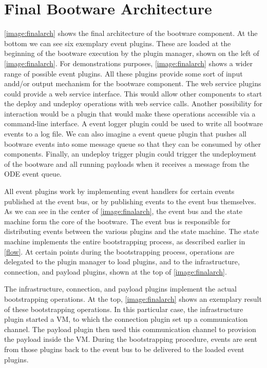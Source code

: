 \section{Final Bootware Architecture}
\label{finalarch}

\autoref{image:finalarch} shows the final architecture of the bootware component.
At the bottom we can see six exemplary event plugins.
These are loaded at the beginning of the bootware execution by the plugin manager, shown on the left of \autoref{image:finalarch}.
For demonstrations purposes, \autoref{image:finalarch} shows a wider range of possible event plugins.
All these plugins provide some sort of input andd/or output mechanism for the bootware component.
The web service plugins could provide a web service interface.
This would allow other components to start the deploy and undeploy operations with web service calls.
Another possibility for interaction would be a  plugin that would make these operations accessible via a command-line interface.
A event logger plugin could be used to write all bootware events to a log file.
We can also imagine a event queue plugin that pushes all bootware events into some message queue so that they can be consumed by other components.
Finally, an undeploy trigger plugin could trigger the undeployment of the bootware and all running payloads when it receives a message from the ODE event queue.

All event plugins work by implementing event handlers for certain events published at the event bus, or by publishing events to the event bus themselves.
As we can see in the center of \autoref{image:finalarch}, the event bus and the state machine form the core of the bootware.
The event bus is responsible for distributing events between the various plugins and the state machine.
The state machine implements the entire bootstrapping process, as described earlier in \autoref{flow}.
At certain points during the bootstrapping process, operations are delegated to the plugin manager to load plugins, and to the infrastructure, connection, and payload plugins, shown at the top of \autoref{image:finalarch}.

The infrastructure, connection, and payload plugins implement the actual bootstrapping operations.
At the top, \autoref{image:finalarch} shows an exemplary result of these bootstrapping operations.
In this particular case, the infrastructure plugin started a VM, to which the connection plugin set up a communication channel.
The payload plugin then used this communication channel to provision the payload inside the VM.
During the bootstrapping procedure, events are sent from those plugins back to the event bus to be delivered to the loaded event plugins.


